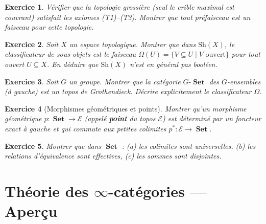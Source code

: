 \documentclass[a4paper,12pt]{book}
\DeclareMathOperator{\Set}{\mathbf{Set}}
\newtheorem{exercice}{Exercice}[chapter]
\begin{document}
\begin{exercice}\label{exo:topologie-triviale}
Vérifier que la topologie grossière (seul le crible maximal est
couvrant) satisfait les axiomes (T1)--(T3).  Montrer que tout
préfaisceau est un faisceau pour cette topologie.
\end{exercice}

\begin{exercice}\label{exo:omega-Sh}
Soit $X$ un espace topologique.  Montrer que dans $\mathrm{Sh}(X)$,
le classificateur de sous-objets est le faisceau
$\Omega(U) = \{V \subseteq U \mid V \text{ ouvert}\}$
pour tout ouvert $U \subseteq X$.
En déduire que $\mathrm{Sh}(X)$ n'est en général pas booléen.
\end{exercice}

\begin{exercice}\label{exo:G-set-topos}
Soit $G$ un groupe.  Montrer que la catégorie $G\text{-}\Set$ des
$G$-ensembles (à gauche) est un topos de Grothendieck.
Décrire explicitement le classificateur $\Omega$.
\end{exercice}

\begin{exercice}[Morphismes géométriques et points]\label{exo:points-topos}
Montrer qu'un morphisme géométrique $p \colon \Set \to \mathcal{E}$
(appelé \textbf{point} du topos $\mathcal{E}$) est déterminé par
un foncteur exact à gauche et qui commute aux petites colimites
$p^* \colon \mathcal{E} \to \Set$.
\end{exercice}

\begin{exercice}\label{exo:giraud-conditions}
Montrer que dans $\Set$ :
(a) les colimites sont universelles,
(b) les relations d'équivalence sont effectives,
(c) les sommes sont disjointes.
\end{exercice}




\chapter{Théorie des $\infty$-catégories --- Aperçu}\label{ch:infty-cat}
\minitoc
\end{document}
